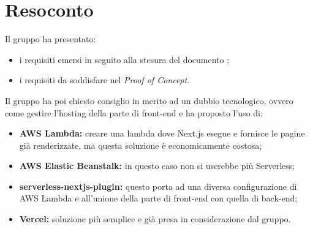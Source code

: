\section{Resoconto}
Il gruppo ha presentato:
\begin{itemize}
\item i requisiti emersi in seguito alla stesura del documento ;
\item i requisiti da soddisfare nel \textit{Proof of Concept}. 
\end{itemize}
Il gruppo ha poi chiesto consiglio in merito ad un dubbio tecnologico, ovvero come gestire l'hosting della parte di front-end e \Proponente{} ha proposto l'uso di:
\begin{itemize}
\item \textbf{AWS Lambda:} creare una lambda dove Next.js esegue e fornisce le pagine già renderizzate, ma questa soluzione è economicamente costosa;
\item \textbf{AWS Elastic Beanstalk:} in questo caso non si userebbe più Serverless;
\item \textbf{serverless-nextjs-plugin:} questo porta ad una diversa configurazione di AWS Lambda e all'unione della parte di front-end con quella di back-end;
\item \textbf{Vercel:} soluzione più semplice e già presa in considerazione dal gruppo.
\end{itemize}


